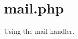 \hypertarget{mail_8php-example}{
\section{mail.php}
}
Using the mail handler.


\begin{DoxyCodeInclude}
\end{DoxyCodeInclude}
 